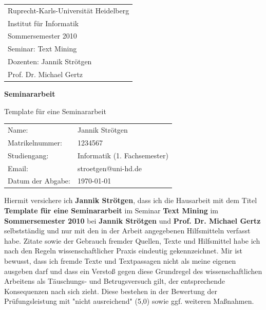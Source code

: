 \documentclass[
     11pt,         %
     a4paper,      %
     oneside,
     ]{article}
\newcommand{\mytitle}{Template für eine Seminararbeit}
\newcommand{\myauthor}{Jannik Strötgen}
\newcommand{\myseminar}{Text Mining}
\newcommand{\mysemester}{Sommersemester 2010}
\newcommand{\mydozent}{Jannik Strötgen}
\newcommand{\mydozentTwo}{Prof. Dr. Michael Gertz}
\begin{document}
\begin{titlepage}
\begin{tabular}[l]{l}
Ruprecht-Karls-Universität Heidelberg\\
Institut für Informatik\\
\mysemester\\
Seminar: \myseminar\\
Dozenten: \mydozent\\
\phantom{Dozenten: }\mydozentTwo\\
\end{tabular}

\vspace{4cm}
\begin{center}
\textbf{\large Seminararbeit} %
\vspace{0.5\baselineskip}

{\huge
\mytitle
}
\end{center}

\vfill 
\begin{tabular}[l]{ll}
Name:           & \myauthor\\
Matrikelnummer: & 1234567\\
Studiengang:    & Informatik (1. Fachsemester)\\
Email: & stroetgen@uni-hd.de\\
Datum der Abgabe: & \today \\
\end{tabular}

\end{titlepage}

\onehalfspacing


\thispagestyle{empty}
\vspace*{100pt}
Hiermit versichere ich \textbf{\myauthor}, dass ich die Hausarbeit mit dem Titel \textbf{\mytitle}
im Seminar \textbf{\myseminar}
im \textbf{\mysemester}
bei \textbf{\mydozent} und \textbf{\mydozentTwo}
selbstständig und nur mit den in der Arbeit angegebenen Hilfsmitteln verfasst habe.
Zitate sowie der Gebrauch fremder Quellen, Texte und Hilfsmittel habe ich nach den
Regeln wissenschaftlicher Praxis eindeutig gekennzeichnet. 
Mir ist bewusst, dass ich
fremde Texte und Textpassagen nicht als meine eigenen ausgeben darf und dass ein
Verstoß gegen diese Grundregel des wissenschaftlichen Arbeitens als Täuschungs- und
Betrugsversuch gilt, der entsprechende Konsequenzen nach sich zieht. Diese bestehen
in der Bewertung der Prüfungsleistung mit "nicht ausreichend" (5,0) sowie ggf. weiteren
Maßnahmen.
\end{document}
